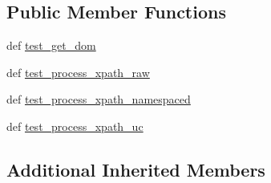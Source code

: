 \subsection*{Public Member Functions}
\begin{DoxyCompactItemize}
\item 
def \hyperlink{classcheshire3_1_1test_1_1test_record_1_1_lxml_record_test_case_a59703cedb9ccd8ef43ad8f34242620cd}{test\-\_\-get\-\_\-dom}
\item 
def \hyperlink{classcheshire3_1_1test_1_1test_record_1_1_lxml_record_test_case_afb9c605a8188446fe26cb1b94044a7af}{test\-\_\-process\-\_\-xpath\-\_\-raw}
\item 
def \hyperlink{classcheshire3_1_1test_1_1test_record_1_1_lxml_record_test_case_a7e55b14a9af51e3a4c9941495f6e691a}{test\-\_\-process\-\_\-xpath\-\_\-namespaced}
\item 
def \hyperlink{classcheshire3_1_1test_1_1test_record_1_1_lxml_record_test_case_a55e6833ec342d95b92bb198eee2798aa}{test\-\_\-process\-\_\-xpath\-\_\-uc}
\end{DoxyCompactItemize}
\subsection*{Additional Inherited Members}


